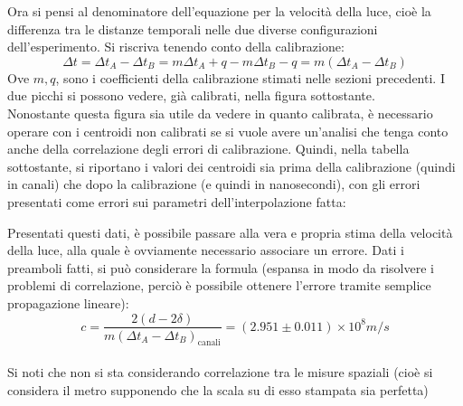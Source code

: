 Ora si pensi al denominatore dell'equazione per la velocità della luce, cioè la differenza tra le distanze temporali nelle due diverse configurazioni dell'esperimento.
Si riscriva tenendo conto della calibrazione:
$$
  \Delta t = \Delta t_A - \Delta t_B = m\Delta t_A + q - m\Delta t_B - q = m (\Delta t_A - \Delta t_B) 
$$
Ove $m,q$, sono i coefficienti della calibrazione stimati nelle sezioni precedenti. I due picchi si possono vedere, già calibrati, nella figura sottostante.\\

Nonostante questa figura sia utile da vedere in quanto calibrata, è necessario operare con i centroidi non calibrati se si vuole avere un'analisi che tenga conto anche
della correlazione degli errori di calibrazione. Quindi, nella tabella sottostante, si riportano i valori dei centroidi sia prima della calibrazione (quindi in canali)
che dopo la calibrazione (e quindi in nanosecondi), con gli errori presentati come errori sui parametri dell'interpolazione fatta:



Presentati questi dati, è possibile passare alla vera e propria stima della velocità della luce, alla quale è ovviamente necessario associare un errore. Dati i preamboli
fatti, si può considerare la formula (espansa in modo da risolvere i problemi di correlazione, perciò è possibile ottenere l'errore tramite semplice propagazione
lineare):
$$
  c = \frac{2 ( d - 2 \delta)}{m (\Delta t_A - \Delta t_B)_\text{canali}} = (2.951 \pm 0.011) \times 10^8 m/s 
$$
\\

Si noti che non si sta considerando correlazione tra le misure spaziali (cioè si considera il metro supponendo che la scala su di esso stampata sia perfetta)

